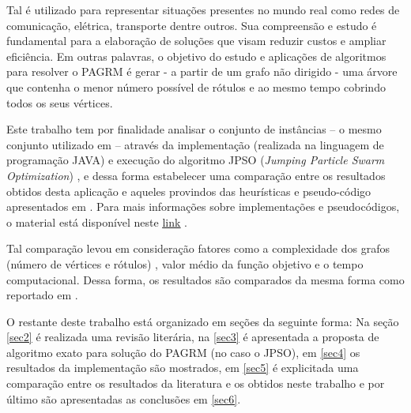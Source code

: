 \documentclass{sig-alternate-05-2015}
\begin{document}
Tal é utilizado para representar situações presentes no mundo real como redes de comunicação, elétrica, transporte dentre outros. Sua compreensão e estudo
é fundamental para a elaboração de soluções que visam reduzir custos e ampliar eficiência. Em outras palavras, o objetivo do estudo e aplicações de algoritmos para resolver o PAGRM é gerar - a partir de um grafo não dirigido - uma árvore que contenha o menor número possível de rótulos e ao mesmo tempo cobrindo todos os seus vértices.

Este trabalho tem por finalidade analisar o conjunto de instâncias  -- o mesmo conjunto utilizado em \cite{consoli2009greedy} -- através da implementação (realizada na linguagem de programação JAVA) e execução do algoritmo JPSO (\textit{Jumping Particle Swarm Optimization}) \cite{consoli2008discrete}, e dessa forma estabelecer uma comparação entre os resultados obtidos desta aplicação e aqueles provindos das heurísticas e pseudo-código apresentados em \cite{consoli2009greedy}. Para mais informações sobre implementações e pseudocódigos, o material está disponível neste \href{https://github.com/felipeveigaramos/Teoria-dos-grafos--arvore-geradora-de-rotulos-minimos}{\color{Blue}\underline{link}} .

Tal comparação levou em consideração fatores como a complexidade dos grafos (número de vértices e rótulos) , valor médio da função objetivo e o tempo computacional. Dessa forma, os resultados são comparados da mesma forma como reportado em \cite{consoli2009greedy}.

O restante deste trabalho está organizado em seções da seguinte forma: Na seção \ref{sec2} é realizada uma revisão literária, na \ref{sec3} é apresentada
a proposta de algoritmo exato para solução do PAGRM (no caso o JPSO), em \ref{sec4} os resultados da implementação são mostrados, em \ref{sec5} é explicitada
uma comparação entre os resultados da literatura e os obtidos neste trabalho e por último são apresentadas as conclusões em \ref{sec6}.
\end{document}
